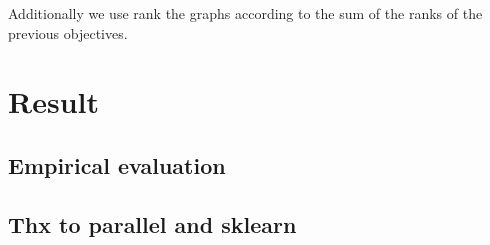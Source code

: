 \documentclass{esannV2}
\begin{document}
Additionally we use rank the graphs according to the sum of the ranks of the previous objectives.

\section{Result}

\subsection{Empirical evaluation}



\subsection*{Thx to parallel and sklearn}




\end{document}
